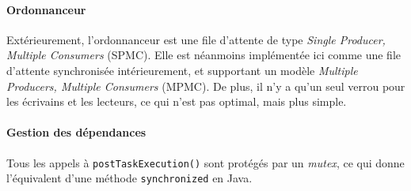 \documentclass[11pt]{article}
\theoremstyle{plain} %
\theoremstyle{definition} %
\begin{document}
\paragraph{Ordonnanceur}
\label{sec:ordonnanceur}
Extérieurement, l'ordonnanceur est une file d'attente de type \emph{Single Producer, Multiple Consumers} (SPMC).
Elle est néanmoins implémentée ici comme une file d'attente synchronisée intérieurement, et supportant un modèle \emph{Multiple Producers, Multiple Consumers} (MPMC).
De plus, il n'y a qu'un seul verrou pour les écrivains et les lecteurs, ce qui n'est pas optimal, mais plus simple.

\paragraph{Gestion des dépendances}
\label{sec:gest-des-depend}
Tous les appels à \texttt{postTaskExecution()} sont protégés par un \emph{mutex}, ce qui donne l'équivalent d'une méthode \texttt{synchronized} en Java.
\end{document}
